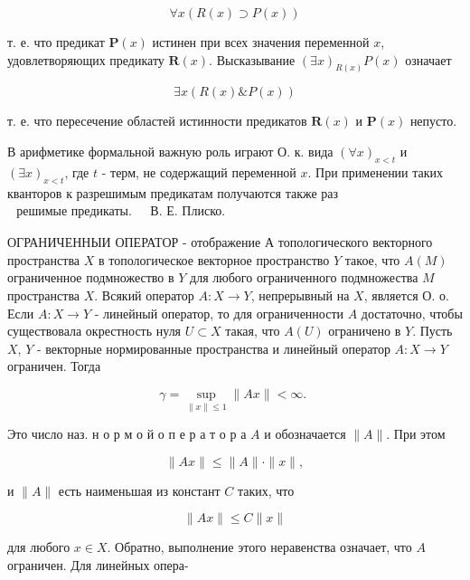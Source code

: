 \documentclass[10pt]{article}
\begin{document}
\[

\forall x(R(x) \supset P(x))

\]



т. е. что предикат $\boldsymbol{P}(x)$ истинен при всех значения переменной $x$, удовлетворяющих предикату $\boldsymbol{R}(x)$. Высказывание $(\exists x)_{R(x)} P(x)$ означает



\[

\exists x(R(x) \& P(x))

\]



т. е. что пересечение областей истинности предикатов $\boldsymbol{R}(x)$ и $\boldsymbol{P}(x)$ непусто.



В арифметике формальной важную роль играют О. к. вида $(\forall x)_{x<t}$ и $(\exists x)_{x<t}$, где $t$ - терм, не содержащий переменной $x$. При применении таких кванторов к разрешимым предикатам получаются также раз$\begin{array}{ll}\text { решимые предикаты. } & \text { В. Е. Плиско. }\end{array}$



ОГРАНИЧЕННЫИ ОПЕРАТОР - отображение А топологического векторного пространства $X$ в топологическое векторное пространство $Y$ такое, что $A(M)$ ограниченное подмножество в $Y$ для любого ограниченного подмножества $M$ пространства $X$. Всякий оператор $A: X \rightarrow Y$, непрерывный на $X$, является О. о. Если $A: X \rightarrow Y$ - линейный оператор, то для ограниченности $A$ достаточно, чтобы существовала окрестность нуля $U \subset X$ такая, что $A(U)$ ограничено в $Y$. Пусть $X$, $Y$ - векторные нормированные пространства и линейный оператор $A: X \rightarrow Y$ ограничен. Тогда



\[

\gamma=\sup _{\|x\| \leqslant 1}\|A x\|<\infty \text {. }

\]



Это число наз. н о р м о й о п е р а т о р а $A$ и обозначается $\|A\|$. При этом



\[

\|A x\| \leqslant\|A\| \cdot\|x\|,

\]



и $\|A\|$ есть наименьшая из констант $C$ таких, что



\[

\|A x\| \leqslant C\|x\|

\]



для любого $x \in X$. Обратно, выполнение этого неравенства означает, что $A$ ограничен. Для линейных опера-
\end{document}
